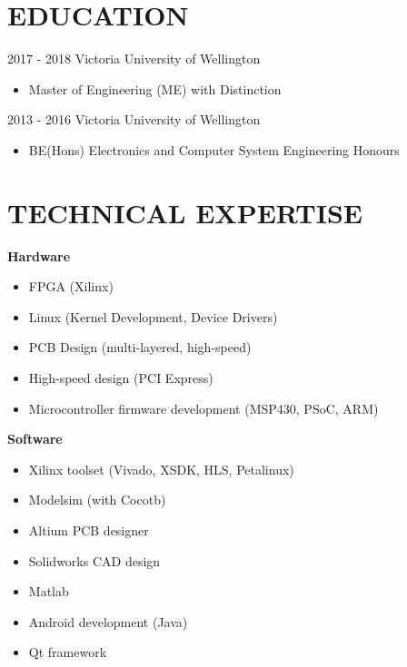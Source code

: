 \documentclass[3pt]{res}
\begin{document}
\begin{resume}
 \section{EDUCATION}
\vspace{0.1in}

       2017 - 2018 Victoria University of Wellington
       \begin{itemize}
       \item Master of Engineering (ME) with Distinction
       \end{itemize}

     2013 - 2016 Victoria University of Wellington
      \begin{itemize} %
      \item[] BE(Hons) Electronics and Computer System Engineering Honours
      \end{itemize}

\section{TECHNICAL EXPERTISE}
{\bf Hardware}
    \begin{itemize}[noitemsep]
      \item FPGA (Xilinx)
      \item Linux (Kernel Development, Device Drivers)
      \item PCB Design (multi-layered, high-speed)
      \item High-speed design (PCI Express)
      \item Microcontroller firmware development (MSP430, PSoC, ARM)
    \end{itemize}

  \newpage

 {\bf Software}
    \begin{itemize}[noitemsep]
        \item Xilinx toolset (Vivado, XSDK, HLS, Petalinux)
        \item Modelsim (with Cocotb)
    \item Altium PCB designer
      \item Solidworks CAD design
      \item Matlab
      \item Android development (Java)
      \item Qt framework


\end{itemize}
\end{resume}
\end{document}
